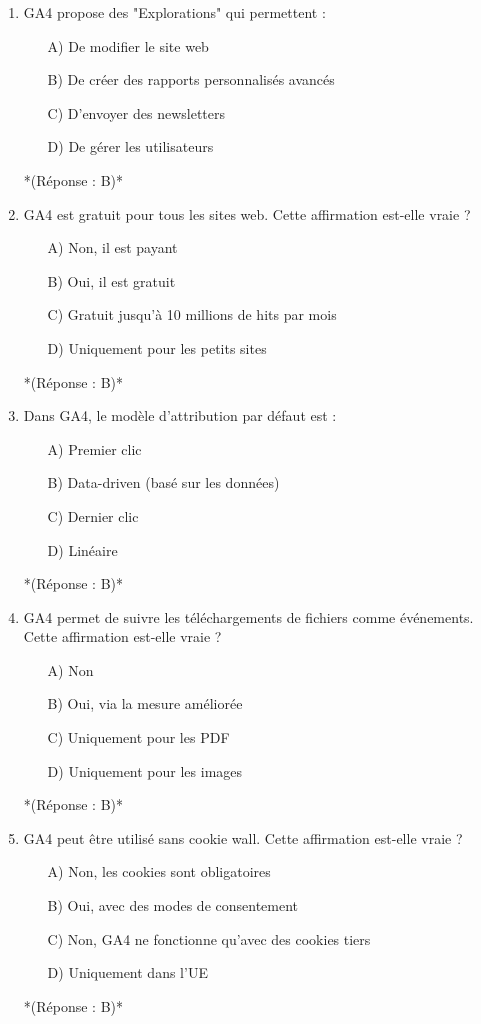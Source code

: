 \documentclass[12pt,a4paper,twoside]{report}
\begin{document}
\begin{enumerate}
    \item GA4 propose des "Explorations" qui permettent :
    \begin{itemize}
        \item[A)] De modifier le site web
        \item[B)] De créer des rapports personnalisés avancés
        \item[C)] D'envoyer des newsletters
        \item[D)] De gérer les utilisateurs
    \end{itemize}
    *(Réponse : B)*

    \item GA4 est gratuit pour tous les sites web. Cette affirmation est-elle vraie ?
    \begin{itemize}
        \item[A)] Non, il est payant
        \item[B)] Oui, il est gratuit
        \item[C)] Gratuit jusqu'à 10 millions de hits par mois
        \item[D)] Uniquement pour les petits sites
    \end{itemize}
    *(Réponse : B)*

    \item Dans GA4, le modèle d'attribution par défaut est :
    \begin{itemize}
        \item[A)] Premier clic
        \item[B)] Data-driven (basé sur les données)
        \item[C)] Dernier clic
        \item[D)] Linéaire
    \end{itemize}
    *(Réponse : B)*

    \item GA4 permet de suivre les téléchargements de fichiers comme événements. Cette affirmation est-elle vraie ?
    \begin{itemize}
        \item[A)] Non
        \item[B)] Oui, via la mesure améliorée
        \item[C)] Uniquement pour les PDF
        \item[D)] Uniquement pour les images
    \end{itemize}
    *(Réponse : B)*

    \item GA4 peut être utilisé sans cookie wall. Cette affirmation est-elle vraie ?
    \begin{itemize}
        \item[A)] Non, les cookies sont obligatoires
        \item[B)] Oui, avec des modes de consentement
        \item[C)] Non, GA4 ne fonctionne qu'avec des cookies tiers
        \item[D)] Uniquement dans l'UE
    \end{itemize}
    *(Réponse : B)*


\end{enumerate}
\end{document}
